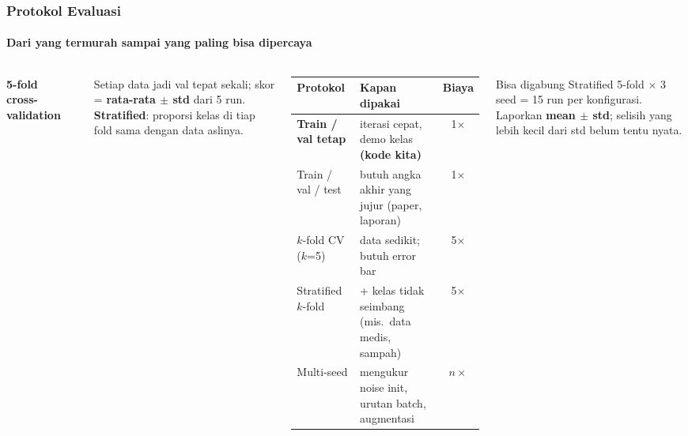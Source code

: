 \documentclass[t,aspectratio=169,xcolor={dvipsnames,table}]{beamer}
\newcommand{\con}[1]{\textcolor{dlOrange}{#1}}
\begin{document}
\begin{frame}
    \frametitle{Protokol Evaluasi}
    \framesubtitle{Dari yang termurah sampai yang paling bisa dipercaya}
    \footnotesize

    \begin{columns}[T]
        \textbf{5-fold cross-validation}
        \begin{center}
        \end{center}
        {\scriptsize Setiap data jadi val tepat sekali; skor = \textbf{rata-rata $\pm$ std} dari 5 run. \textbf{Stratified}: proporsi kelas di tiap fold sama dengan data aslinya.}

        \scriptsize
        \renewcommand{\arraystretch}{1.25}
        \begin{tabular}{>{\raggedright\arraybackslash}p{2.1cm}>{\raggedright\arraybackslash}p{3.6cm}c}
            \toprule
            \textbf{Protokol} & \textbf{Kapan dipakai} & \textbf{Biaya} \\
            \midrule
            \textbf{Train / val tetap} & iterasi cepat, demo kelas \textbf{(kode kita)} & 1$\times$ \\
            Train / val / test & butuh angka akhir yang jujur (paper, laporan) & 1$\times$ \\
            $k$-fold CV ($k$=5) & data sedikit; butuh error bar & 5$\times$ \\
            Stratified $k$-fold & + kelas tidak seimbang (mis.\ data medis, sampah) & 5$\times$ \\
            Multi-seed & mengukur noise init, urutan batch, augmentasi & $n\times$ \\
            \bottomrule
        \end{tabular}

        \vspace{0.15cm}
        \begin{exampleblock}{Bisa digabung}
            Stratified 5-fold $\times$ 3 seed = 15 run per konfigurasi. Laporkan \textbf{mean $\pm$ std}; selisih yang lebih kecil dari std \con{belum tentu nyata}.
        \end{exampleblock}
    \end{columns}
\end{frame}
\end{document}
